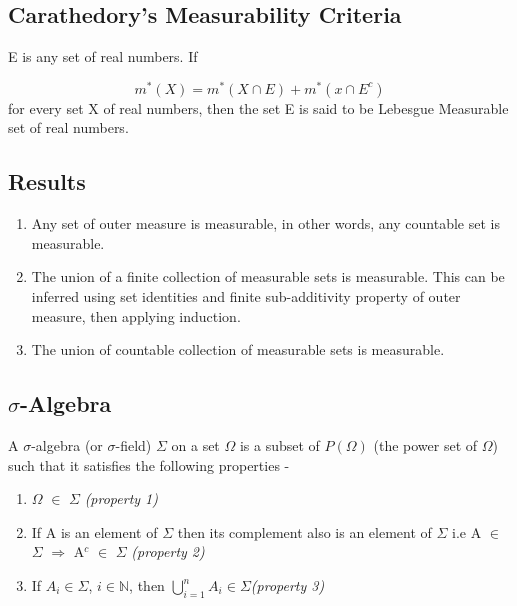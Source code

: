 \documentclass{article}
\begin{document}
\subsection{Carathedory's Measurability Criteria}

E is any set of real numbers. If

$$m^*(X)= m^*(X \cap E) + m^*(x \cap E^c) $$
for every set X of real numbers, then the set E is said to be Lebesgue Measurable set of real numbers.

\subsection{Results}
\begin{enumerate}
    \item Any set of outer measure is measurable, in other words, any countable set is measurable.
    \item The union of a finite collection of measurable sets is measurable. This can be inferred using set identities and finite sub-additivity property of outer measure, then applying induction.
    \item The union of countable collection of measurable sets is measurable.
\end{enumerate}

\subsection{$\sigma$-Algebra}
A $\sigma$-algebra (or $\sigma$-field) $\Sigma$ on a set $\Omega$ is a subset of $P(\Omega)$ (the power set of $\Omega$) such that it satisfies the following properties -


\begin{enumerate}
	\item $\Omega$ $\in$ $\Sigma$ \textit{(property 1)}
	\item If A is an element of $\Sigma$ then its complement also is an element of $\Sigma$ i.e A $\in$ $\Sigma$ $\Rightarrow$ A$^c$ $\in$ $\Sigma$ \textit{(\textit{property 2})}
	\item If $A_i \in \Sigma$, 
	$i\in \mathbb{N}$, then $\bigcup\limits_{i=1}^{n}A_i \in \Sigma$\textit{(\textit{property 3})}
\end{enumerate}
\end{document}

